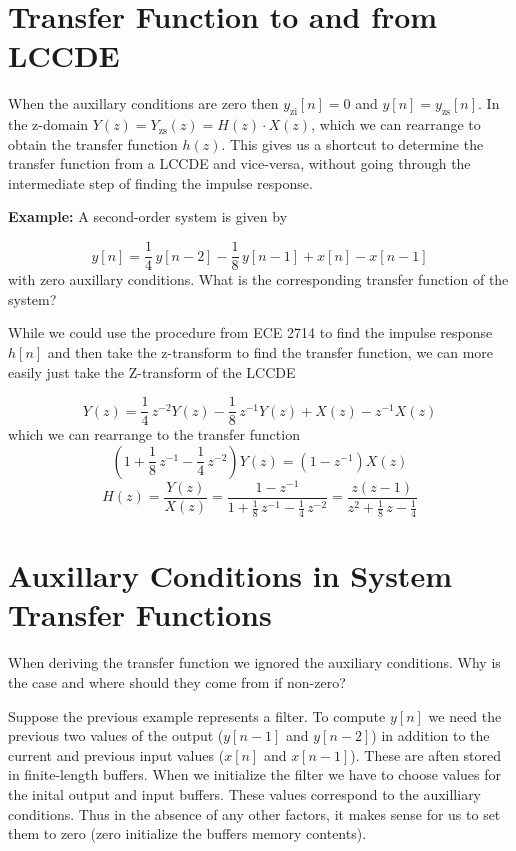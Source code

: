 \documentclass{article}
\begin{document}
\section{Transfer Function to and from LCCDE}
When the auxillary conditions are zero then $y_{\mbox{zi}}[n] = 0$ and $y[n] = y_{\mbox{zs}}[n]$. In the z-domain $Y(z) = Y_{\mbox{zs}}(z) = H(z)\cdot X(z)$, which we can rearrange to obtain the transfer function $h(z)$. This gives us a shortcut to determine the transfer function from a LCCDE and vice-versa, without going through the intermediate step of finding the impulse response.

\textbf{Example:} A second-order system is given by

\[
y[n] = \frac{1}{4}\,y[n-2] - \frac{1}{8}\, y[n-1] + x[n] - x[n-1]
\]
with zero auxillary conditions. What is the corresponding transfer function of the system?

While we could use the procedure from ECE 2714 to find the impulse response $h[n]$ and then take the z-transform to find the transfer function, we can more easily just take the Z-transform of the LCCDE

\[
Y(z) = \frac{1}{4}\,z^{-2} Y(z) - \frac{1}{8}\, z^{-1} Y(z) + X(z) - z^{-1}X(z)
\]
which we can rearrange to the transfer function
\[
\left(1 + \frac{1}{8}\, z^{-1} - \frac{1}{4}\,z^{-2}  \right) Y(z) = \left( 1- z^{-1} \right) X(z) 
\]
\[
H(z) = \frac{Y(z)}{X(z)} = \frac{1- z^{-1}}{1 + \frac{1}{8}\, z^{-1} - \frac{1}{4}\,z^{-2} } =  \frac{z(z-1)}{z^2 + \frac{1}{8}\, z - \frac{1}{4}}
\]

\section{Auxillary Conditions in System Transfer Functions}

When deriving the transfer function we ignored the auxiliary conditions. Why is the case and where should they come from if non-zero?

Suppose the previous example represents a filter. To compute $y[n]$ we need the previous two values of the output ($y[n-1]$ and $y[n-2]$) in addition to the current and previous input values ($x[n]$ and $x[n-1]$). These are aften stored in finite-length buffers. When we initialize the filter we have to choose values for the inital output and input buffers. These values correspond to the auxilliary conditions. Thus in the absence of any other factors, it makes sense for us to set them to zero (zero initialize the buffers memory contents).
\end{document}
